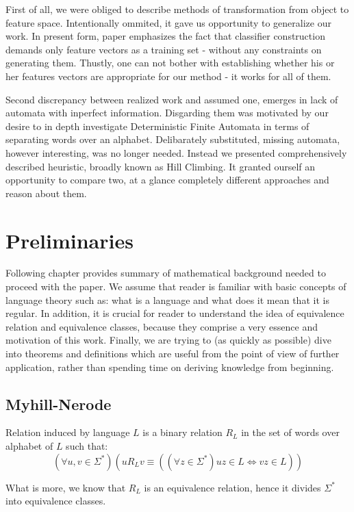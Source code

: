 \documentclass{mini}
\begin{document}
First of all, we were obliged to describe methods of transformation from object
to feature space. Intentionally ommited, it gave us opportunity to generalize 
our work. In present form, paper emphasizes the fact that classifier construction 
demands only feature vectors as a training set - without any constraints on generating them. 
Thustly, one can not bother with establishing whether his or her features vectors
are appropriate for our method - it works for all of them.

Second discrepancy between realized work and assumed one, emerges in lack of
automata with inperfect information. Disgarding them was motivated by our desire 
to in depth investigate Deterministic Finite Automata in terms of separating words
over an alphabet. Delibarately substituted, missing automata, however interesting, was no longer needed.
Instead we presented comprehensively described heuristic, broadly known as Hill Climbing. 
It granted ourself an opportunity to compare two, at a glance completely different approaches 
and reason about them. 

\chapter{Preliminaries}\label{chap:prelim}
Following chapter provides summary of mathematical background needed to proceed with the paper. We assume that reader is familiar with basic concepts of language theory such as: what is a language and what does it mean that it is regular. In addition, it is crucial for reader to understand the idea of equivalence relation and equivalence classes, because they comprise a very essence and motivation of this work. Finally, we are trying to (as quickly as possible) dive into theorems and definitions which are useful from the point of view of further application, rather than spending time on deriving knowledge from beginning.
\section{Myhill-Nerode}
\begin{definition} \label{def:myhill}
    Relation induced by language $L$ is a binary relation $R_{L}$ in the set of words over alphabet of $L$ such that:
    \[
    (\forall{u,v \in \Sigma^{*}})(u R_{L} v \equiv ((\forall z \in \Sigma^{*}) uz \in L \Leftrightarrow vz \in L))
    \]
\end{definition}
What is more, we know that $R_{L}$ is an equivalence relation, hence it divides $\Sigma^{*}$ into equivalence classes.
\end{document}
